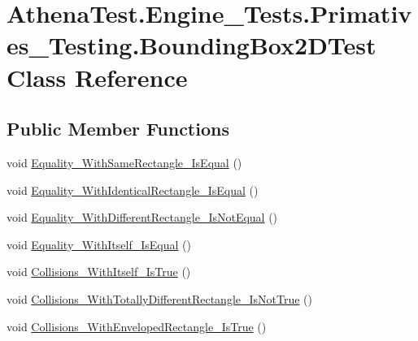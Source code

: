 \hypertarget{class_athena_test_1_1_engine___tests_1_1_primatives___testing_1_1_bounding_box2_d_test}{\section{Athena\-Test.\-Engine\-\_\-\-Tests.\-Primatives\-\_\-\-Testing.\-Bounding\-Box2\-D\-Test Class Reference}
\label{class_athena_test_1_1_engine___tests_1_1_primatives___testing_1_1_bounding_box2_d_test}
}
\subsection*{Public Member Functions}
\begin{DoxyCompactItemize}
\item 
void \hyperlink{class_athena_test_1_1_engine___tests_1_1_primatives___testing_1_1_bounding_box2_d_test_a41570531984b68e12fdd527bef651ec6}{Equality\-\_\-\-With\-Same\-Rectangle\-\_\-\-Is\-Equal} ()
\item 
void \hyperlink{class_athena_test_1_1_engine___tests_1_1_primatives___testing_1_1_bounding_box2_d_test_abc1fb7d6fb93718b0aea96f217bcc602}{Equality\-\_\-\-With\-Identical\-Rectangle\-\_\-\-Is\-Equal} ()
\item 
void \hyperlink{class_athena_test_1_1_engine___tests_1_1_primatives___testing_1_1_bounding_box2_d_test_a76868bce17dd8ff8f2fc43784acab3b3}{Equality\-\_\-\-With\-Different\-Rectangle\-\_\-\-Is\-Not\-Equal} ()
\item 
void \hyperlink{class_athena_test_1_1_engine___tests_1_1_primatives___testing_1_1_bounding_box2_d_test_a9159affe63c312548c104265945d3900}{Equality\-\_\-\-With\-Itself\-\_\-\-Is\-Equal} ()
\item 
void \hyperlink{class_athena_test_1_1_engine___tests_1_1_primatives___testing_1_1_bounding_box2_d_test_aaa5367e455750e9ef9271668f11c5e9a}{Collisions\-\_\-\-With\-Itself\-\_\-\-Is\-True} ()
\item 
void \hyperlink{class_athena_test_1_1_engine___tests_1_1_primatives___testing_1_1_bounding_box2_d_test_a12118a39bfe95d192a693a3bb990ae8c}{Collisions\-\_\-\-With\-Totally\-Different\-Rectangle\-\_\-\-Is\-Not\-True} ()
\item 
void \hyperlink{class_athena_test_1_1_engine___tests_1_1_primatives___testing_1_1_bounding_box2_d_test_a73d4eb81dcd68ee0dbd698013f68cb0e}{Collisions\-\_\-\-With\-Enveloped\-Rectangle\-\_\-\-Is\-True} ()

\end{DoxyCompactItemize}
